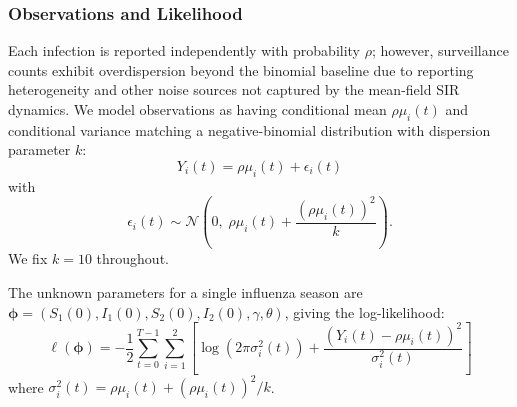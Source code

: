 \documentclass[11pt]{article}
\begin{document}
\subsubsection{Observations and Likelihood}\label{subsub:noise}
Each infection is reported independently with probability $\rho$;
however, surveillance counts exhibit overdispersion beyond the
binomial baseline due to reporting heterogeneity and other noise
sources not captured by the mean-field SIR dynamics. We model
observations as having conditional mean $\rho\mu_i(t)$ and conditional
variance matching a negative-binomial distribution with dispersion
parameter $k$:
%
%
$$
Y_i(t) = \rho\mu_i(t) + \epsilon_i(t)
$$
%
%
with
%
%
$$
\epsilon_i(t) \sim \mathcal{N}\left(0,\; \rho\mu_i(t) +
\frac{(\rho\mu_i(t))^2}{k}\right).
$$
%
%
We fix $k = 10$ throughout.

The unknown parameters for a single influenza season are
$\boldsymbol{\phi} = (S_1(0), I_1(0), S_2(0), I_2(0), \gamma, \theta)$, giving
the log-likelihood:
\begin{equation}\label{eq:loglik}
\ell(\boldsymbol{\phi}) = -\frac{1}{2}\sum_{t=0}^{T-1}\sum_{i=1}^{2}
\left[\log(2\pi \sigma_i^2(t)) + \frac{(Y_i(t) -
    \rho\mu_i(t))^2}{\sigma_i^2(t)}\right]
\end{equation}
where $\sigma_i^2(t) = \rho\mu_i(t) + (\rho\mu_i(t))^2/k$.
\end{document}
